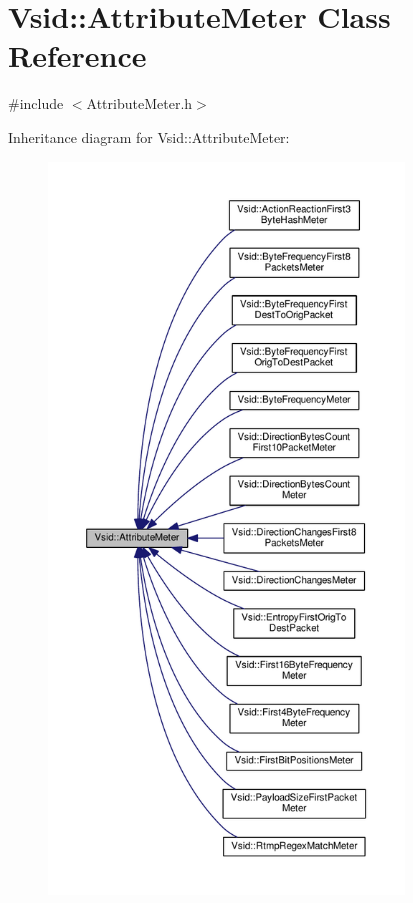 \hypertarget{class_vsid_1_1_attribute_meter}{\section{Vsid\-:\-:Attribute\-Meter Class Reference}
\label{class_vsid_1_1_attribute_meter}
}


{\ttfamily \#include $<$Attribute\-Meter.\-h$>$}



Inheritance diagram for Vsid\-:\-:Attribute\-Meter\-:
\nopagebreak
\begin{figure}[H]
\begin{center}
\leavevmode
\includegraphics[height=550pt]{class_vsid_1_1_attribute_meter__inherit__graph}
\end{center}
\end{figure}
